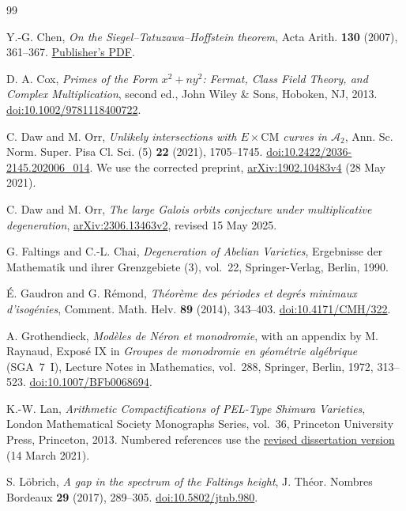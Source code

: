 \documentclass[11pt,a4paper]{article}
\numberwithin{equation}{section}
\theoremstyle{definition}
\theoremstyle{remark}
\newcommand{\A}{\mathcal A}
\newcommand{\CM}{\mathrm{CM}}
\begin{document}
\begin{thebibliography}{99}

Y.-G. Chen,
\emph{On the Siegel--Tatuzawa--Hoffstein theorem},
Acta Arith. \textbf{130} (2007), 361--367.
\href{https://www.impan.pl/shop/en/publication/transaction/download/product/82398}
{Publisher's PDF}.

D. A. Cox,
\emph{Primes of the Form \(x^2+ny^2\): Fermat, Class Field Theory,
and Complex Multiplication},
second ed., John Wiley \& Sons, Hoboken, NJ, 2013.
\href{https://doi.org/10.1002/9781118400722}{doi:10.1002/9781118400722}.

C. Daw and M. Orr,
\emph{Unlikely intersections with \(E\times\CM\) curves in \(\A_2\)},
Ann. Sc. Norm. Super. Pisa Cl. Sci. (5) \textbf{22} (2021), 1705--1745.
\href{https://doi.org/10.2422/2036-2145.202006_014}{doi:10.2422/2036-2145.202006\_014}.
We use the corrected preprint,
\href{https://arxiv.org/abs/1902.10483v4}{arXiv:1902.10483v4}
(28 May 2021).

C. Daw and M. Orr,
\emph{The large Galois orbits conjecture under multiplicative degeneration},
\href{https://arxiv.org/abs/2306.13463v2}{arXiv:2306.13463v2},
revised 15 May 2025.

G. Faltings and C.-L. Chai,
\emph{Degeneration of Abelian Varieties},
Ergebnisse der Mathematik und ihrer Grenzgebiete (3), vol.~22,
Springer-Verlag, Berlin, 1990.

\'E. Gaudron and G. R\'emond,
\emph{Th\'eor\`eme des p\'eriodes et degr\'es minimaux d'isog\'enies},
Comment. Math. Helv. \textbf{89} (2014), 343--403.
\href{https://doi.org/10.4171/CMH/322}{doi:10.4171/CMH/322}.

A. Grothendieck,
\emph{Mod\`eles de N\'eron et monodromie}, with an appendix by M. Raynaud,
Expos\'e IX in \emph{Groupes de monodromie en g\'eom\'etrie alg\'ebrique}
(SGA~7~I), Lecture Notes in Mathematics, vol.~288,
Springer, Berlin, 1972, 313--523.
\href{https://doi.org/10.1007/BFb0068694}{doi:10.1007/BFb0068694}.

K.-W. Lan,
\emph{Arithmetic Compactifications of PEL-Type Shimura Varieties},
London Mathematical Society Monographs Series, vol.~36,
Princeton University Press, Princeton, 2013.
Numbered references use the
\href{https://www.kwlan.org/articles/cpt-PEL-type-thesis-revision.pdf}
{revised dissertation version} (14 March 2021).

S. L\"obrich,
\emph{A gap in the spectrum of the Faltings height},
J. Th\'eor. Nombres Bordeaux \textbf{29} (2017), 289--305.
\href{https://doi.org/10.5802/jtnb.980}{doi:10.5802/jtnb.980}.


\end{thebibliography}
\end{document}
